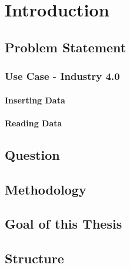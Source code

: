 \chapter{Introduction}
\label{ch:Introduction}

\section{Problem Statement}

\subsection{Use Case - Industry 4.0}

\subsubsection{Inserting Data}

\subsubsection{Reading Data}

\section{Question}

\section{Methodology}

\section{Goal of this Thesis}

\section{Structure}
